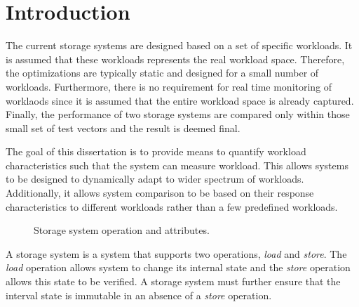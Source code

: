 \chapter{Introduction}
\label{INTRO}



The current storage systems are designed based on a set of specific workloads. 
It is assumed that these workloads represents the real workload space.
Therefore, the optimizations are typically static and designed for a small number of workloads.
Furthermore, there is no requirement for real time monitoring of worklaods since it is assumed that the entire workload space is already captured. 
Finally, the performance of two storage systems are compared only within those small set of test vectors and the result is deemed final. 


The goal of this dissertation is to provide means to quantify workload characteristics such that the system can measure workload.
This allows systems to be designed to dynamically adapt to wider spectrum of workloads.
Additionally, it allows system comparison to be based on their response characteristics to different workloads rather than a few predefined workloads. 


\begin{figure}[!t]
\centering

\caption{Storage system operation and attributes.}
\label{fig:storageAttribute}
\end{figure}

A storage system is a system that supports two operations, \emph{load} and \emph{store}.
The \emph{load} operation allows system to change its internal state and the \emph{store} operation allows this state to be verified.
A storage system must further ensure that the interval state is immutable in an absence of a \emph{store} operation.

